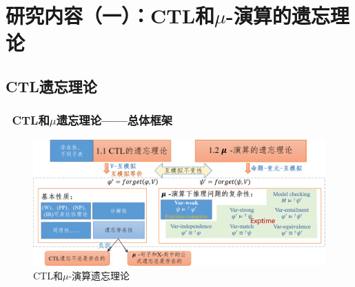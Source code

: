 \documentclass[9pt, CJK]{beamer}
\begin{document}
\section{研究内容（一）：CTL和$\mu$-演算的遗忘理论}
\subsection{CTL遗忘理论}  
\begin{frame}  
	\frametitle{~CTL和$\mu$遗忘理论——{\footnotesize 总体框架}}
	\begin{figure}
		\includegraphics[scale=0.35]{figures/ctlMuForgFrame}
		\caption{CTL和$\mu$-演算遗忘理论}
	\end{figure}
\end{frame}
\end{document}
